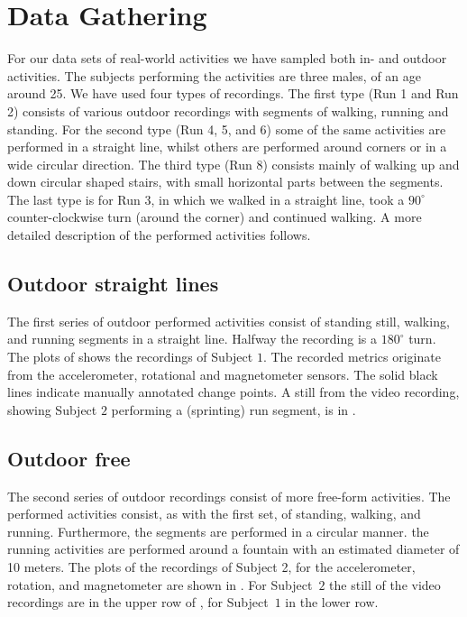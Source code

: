 \section{Data Gathering}\label{sec:data_gathering}
For our data sets of real-world activities we have sampled both in- and outdoor activities.
The subjects performing the activities are three males, of an age around 25.
We have used four types of recordings.
The first type (Run 1 and Run 2) consists of various outdoor recordings with segments of walking, running and standing.
For the second type (Run 4, 5, and 6) some of the same activities are performed in a straight line, whilst others are performed around corners or in a wide circular direction.
The third type (Run 8) consists mainly of walking up and down circular shaped stairs, with small horizontal parts between the segments.
The last type is for Run 3, in which we walked in a straight line, took a $90^{\circ}$ counter-clockwise turn (around the corner) and continued walking.
A more detailed description of the performed activities follows.

\subsection{Outdoor straight lines}\label{subsec:outdoor_straight}
The first series of outdoor performed activities consist of standing still, walking, and running segments in a straight line.
Halfway the recording is a $180^{\circ}$ turn.
The plots of  shows the recordings of Subject $1$.
The recorded metrics originate from the accelerometer, rotational and magnetometer sensors.
The solid black lines indicate manually annotated change points.
A still from the video recording, showing Subject $2$ performing a (sprinting) run segment, is in .

\subsection{Outdoor free}\label{subsec:outdoor_free}
The second series of outdoor recordings consist of more free-form activities.
The performed activities consist, as with the first set, of standing, walking, and running.
Furthermore, the segments are performed in a circular manner.
\eg the running activities are performed around a fountain with an estimated diameter of 10 meters.
The plots of the recordings of Subject 2, for the accelerometer, rotation, and magnetometer are shown in .
For Subject~$2$ the still of the video recordings are in the upper row of , for Subject~$1$ in the lower row.

